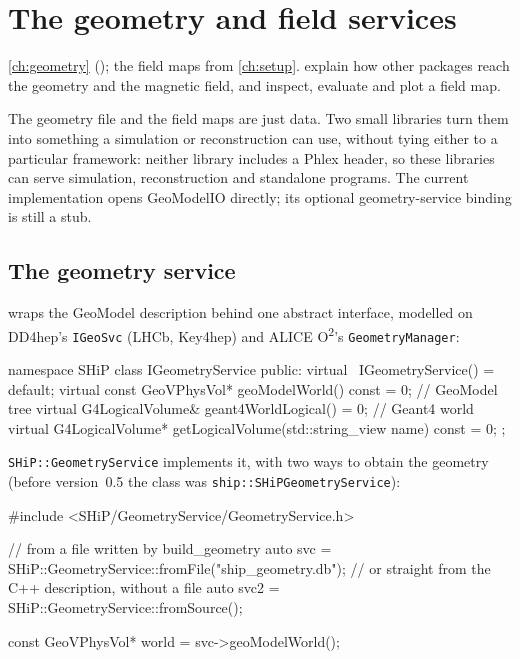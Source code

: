 \chapter{The geometry and field services}
\label{ch:services}

{\cref{ch:geometry} (); the field maps from \cref{ch:setup}.}
{explain how other packages reach the geometry and the magnetic field, and inspect, evaluate and plot a field map.}

The geometry file and the field maps are just data. Two small libraries turn
them into something a simulation or reconstruction can use, without tying
either to a particular framework: neither library includes a Phlex header, so
these libraries can serve simulation, reconstruction and standalone programs.
The current  implementation opens GeoModelIO directly; its
optional geometry-service binding is still a stub.

\section{The geometry service}
\label{sec:geosvc}

 wraps the GeoModel description behind one abstract
interface, modelled on DD4hep's \texttt{IGeoSvc} (LHCb, Key4hep) and ALICE
O\textsuperscript{2}'s \texttt{GeometryManager}:

\begin{cpp}
namespace SHiP {
class IGeometryService {
 public:
  virtual ~IGeometryService() = default;
  virtual const GeoVPhysVol* geoModelWorld() const = 0;           // GeoModel tree
  virtual G4LogicalVolume& geant4WorldLogical() = 0;              // Geant4 world
  virtual G4LogicalVolume* getLogicalVolume(std::string_view name) const = 0;
};
}
\end{cpp}

\texttt{SHiP::GeometryService} implements it, with two ways to obtain the
geometry (before version~0.5 the class was \texttt{ship::SHiPGeometryService}):

\begin{cpp}
#include <SHiP/GeometryService/GeometryService.h>

// from a file written by build_geometry
auto svc = SHiP::GeometryService::fromFile("ship_geometry.db");
// or straight from the C++ description, without a file
auto svc2 = SHiP::GeometryService::fromSource();

const GeoVPhysVol* world = svc->geoModelWorld();
\end{cpp}

